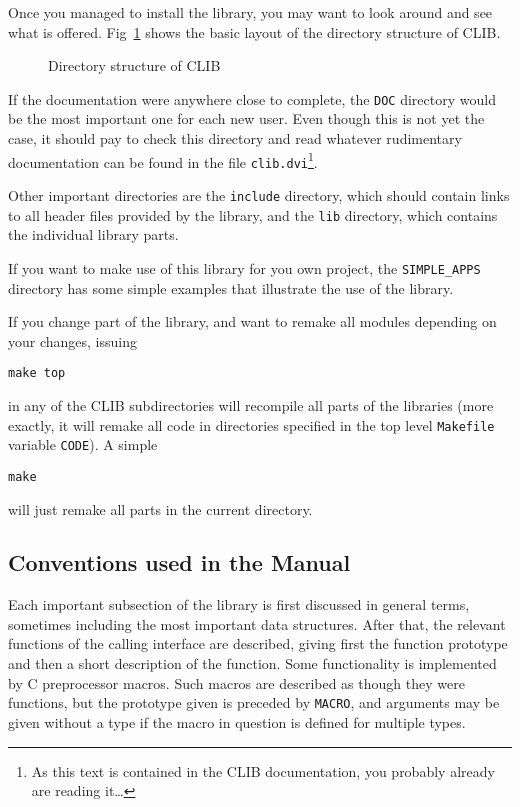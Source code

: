 Once you managed to install the library, you may want to look around
and see what is offered. Fig~\ref{fig:install_start:start:structure}
shows the basic layout of the directory structure of CLIB.


\begin{figure}[htb]
  \begin{center}
    \mbox{} %
    \caption{Directory structure of CLIB}
    \label{fig:install_start:start:structure}
  \end{center}
\end{figure}

If the documentation were anywhere close to complete, the \texttt{DOC}
directory would be the most important one for each new user. Even
though this is not yet the case, it should pay to check this directory
and read whatever rudimentary documentation can be found in the file
\texttt{clib.dvi}\footnote{As this text is contained in the CLIB
  documentation, you probably already are reading it\ldots}.

Other important directories are the \texttt{include} directory, which
should contain links to all header files provided by the library, and
the \texttt{lib} directory, which contains the individual library
parts. 

If you want to make use of this library for you own project, the
\texttt{SIMPLE\_APPS} directory has some simple examples that
illustrate the use of the library.

If you change part of the library, and want to remake all modules
depending on your changes, issuing

\begin{verbatim}
make top
\end{verbatim}
in any of the CLIB subdirectories will recompile all parts of the
libraries (more exactly, it will remake all code in directories
specified in the top level \texttt{Makefile} variable
\texttt{CODE}). A simple 

\begin{verbatim}
make
\end{verbatim}
will just remake all parts in the current directory.


\subsection{Conventions used in the Manual}
\label{sec:install_start:conventions}

Each important subsection of the library is first discussed in general
terms, sometimes including the most important data structures. After
that, the relevant functions of the calling interface are described,
giving first the function prototype and then a short description of
the function. Some functionality is implemented by C preprocessor
macros. Such macros are described as though they were functions, but
the prototype given is preceded by \texttt{MACRO}, and arguments may
be given without a type if the macro in question is defined for
multiple types.


